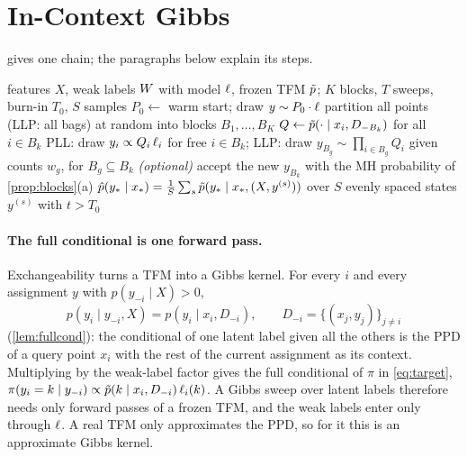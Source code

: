 \section{In-Context Gibbs}\label{sec:method}
 gives one chain; the paragraphs below explain its steps.

\begin{algorithm}[t]
\caption{\ours{}, one chain (block version; LLP uses bag-blocks). No TFM weight is updated.}
\label{alg:icg}
\begin{algorithmic}[1]
\Require features $X$, weak labels $W$ with model $\ell$, frozen TFM $\tilde p$; $K$ blocks, $T$ sweeps, burn-in $T_0$, $S$ samples
\State $P_0\gets$ warm start; draw $y\sim P_0\cdot\ell$ 
  \State partition all points (LLP: all bags) at random into blocks $B_1,\dots,B_K$
    \State $Q\gets\tilde p(\cdot\mid x_i,D_{-B_k})$ for all $i\in B_k$ 
    \State PLL: draw $y_i\propto Q_i\,\ell_i$ for free $i\in B_k$; \quad LLP: draw $y_{B_g}\sim\prod_{i\in B_g}Q_i$ given counts $w_g$, for $B_g\subseteq B_k$
    \State \textit{(optional)} accept the new $y_{B_k}$ with the MH probability of \cref{prop:blocks}(a)
  \EndFor
\EndFor
\State \Return $\hat p(y_*\mid x_*)=\frac1S\sum_s\tilde p(y_*\mid x_*,(X,y^{(s)}))$ over $S$ evenly spaced states $y^{(s)}$ with $t>T_0$
\end{algorithmic}
\end{algorithm}

\paragraph{The full conditional is one forward pass.} Exchangeability turns a TFM into a Gibbs kernel.
For every $i$ and every assignment $y$ with $p(y_{-i}\mid X)>0$,
\begin{equation}\label{eq:lemma1}
  p(y_i\mid y_{-i},X)=p(y_i\mid x_i,D_{-i}),\qquad D_{-i}=\{(x_j,y_j)\}_{j\neq i}
\end{equation}
(\cref{lem:fullcond}): the conditional of one latent label given all the others is the PPD of a query point $x_i$ with
the rest of the current assignment as its context. Multiplying by the weak-label factor gives the full conditional of
$\pi$ in \eqref{eq:target}, $\pi(y_i=k\mid y_{-i})\propto\tilde p(k\mid x_i,D_{-i})\,\ell_i(k)$. A Gibbs sweep over latent
labels therefore needs only forward passes of a frozen TFM, and the weak labels enter only through $\ell$. A real TFM
only approximates the PPD, so for it this is an approximate Gibbs kernel.

